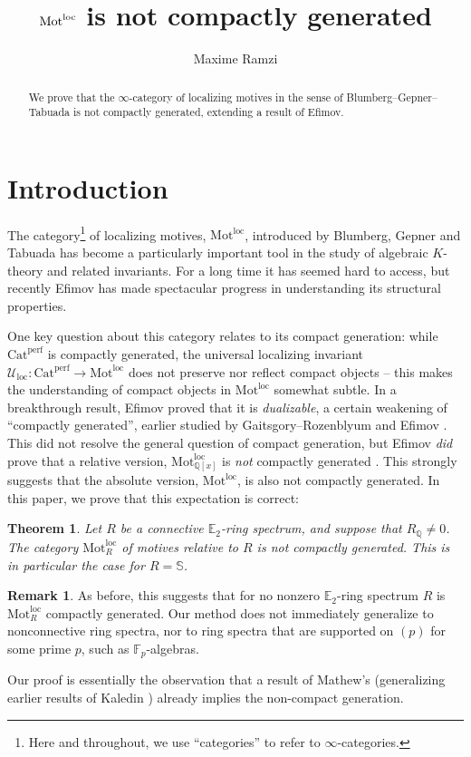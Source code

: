 \documentclass{article}
\title{$\Mot$ is not compactly generated}
\author{Maxime Ramzi}
\date{}
\newtheorem*{thm*}{Theorem}
\theoremstyle{definition}
\newtheorem*{rmk*}{Remark}
\newcommand{\cat}{\mathrm}
\newcommand{\Catperf}{\mathrm{Cat}^{\mathrm{perf}}}
\newcommand{\Sph}{\mathbb S}
\newcommand{\Mot}{\cat{Mot}^{\mathrm{loc}}}
\newcommand{\U}{\mathcal{U}_{\mathrm{loc}}}
\newcommand{\Q}{\mathbb{Q}}
\begin{document}
\maketitle
\begin{abstract}
    We prove that the $\infty$-category of localizing motives in the sense of Blumberg--Gepner--Tabuada is not compactly generated, extending a result of Efimov.  
\end{abstract}
\section*{Introduction}
The category\footnote{Here and throughout, we use ``categories'' to refer to $\infty$-categories.} of localizing motives, $\Mot$, introduced by Blumberg, Gepner and Tabuada \cite{BGT} has become a particularly important tool in the study of algebraic $K$-theory and related invariants. For a long time it has seemed hard to access, but recently Efimov has made spectacular progress in understanding its structural properties.

One key question about this category relates to its compact generation: while $\Catperf$ is compactly generated, the universal localizing invariant $\U:\Catperf\to \Mot$ does not preserve nor reflect compact objects -- this makes the understanding of compact objects in $\Mot$ somewhat subtle. In a breakthrough result, Efimov proved that it is \emph{dualizable}, a certain weakening of ``compactly generated'', earlier studied by Gaitsgory--Rozenblyum \cite{GR} and Efimov \cite{efimov}. This did not resolve the general question of compact generation, but Efimov \emph{did} prove that a relative version, $\Mot_{\Q[x]}$ is \emph{not} compactly generated \cite[Corollary 12.11]{rigidity}. This strongly suggests that the absolute version, $\Mot$, is also not compactly generated. In this paper, we prove that this expectation is correct:
\begin{thm*}\label{thm:main}
    Let $R$ be a connective $\mathbb E_2$-ring spectrum, and suppose that $R_\Q\neq 0$. The category $\Mot_R$ of motives relative to $R$ is not compactly generated. This is in particular the case for $R=\Sph$. 
    \end{thm*}
\begin{rmk*}
    As before, this suggests that for no nonzero $\mathbb E_2$-ring spectrum $R$ is $\Mot_R$ compactly generated. Our method does not immediately generalize to nonconnective ring spectra, nor to ring spectra that are supported on $(p)$ for some prime $p$, such as $\mathbb F_p$-algebras. 
\end{rmk*}
Our proof is essentially the observation that a result of Mathew's \cite{akhil} (generalizing earlier results of Kaledin \cite{kaledin,kaledin2}) already implies the non-compact generation. 
\end{document}
